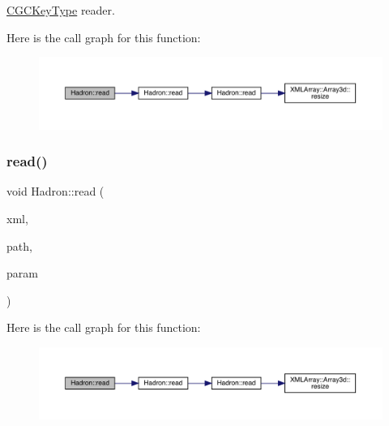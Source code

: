 \mbox{\hyperlink{structHadron_1_1CGCKeyType}{C\+G\+C\+Key\+Type}} reader. 

Here is the call graph for this function\+:
\nopagebreak
\begin{figure}[H]
\begin{center}
\leavevmode
\includegraphics[width=350pt]{d1/daf/namespaceHadron_ad89b4230ad913b777ca725473df40d15_cgraph}
\end{center}
\end{figure}
\mbox{\label{namespaceHadron_aef0c0dfd0f87842b485511132f1c405f}} 
\subsubsection{\texorpdfstring{read()}{read()}\hspace{0.1cm}{\footnotesize\ttfamily [14/94]}}
{\footnotesize\ttfamily void Hadron\+::read (\begin{DoxyParamCaption}\item[{\mbox{\hyperlink{classADATXML_1_1XMLReader}{X\+M\+L\+Reader}} \&}]{xml,  }\item[{const std\+::string \&}]{path,  }\item[{\mbox{\hyperlink{structHadron_1_1KeyHadronNPartNPtCorr__t_1_1NPoint__t}{Key\+Hadron\+N\+Part\+N\+Pt\+Corr\+\_\+t\+::\+N\+Point\+\_\+t}} \&}]{param }\end{DoxyParamCaption})}

Here is the call graph for this function\+:
\nopagebreak
\begin{figure}[H]
\begin{center}
\leavevmode
\includegraphics[width=350pt]{d1/daf/namespaceHadron_aef0c0dfd0f87842b485511132f1c405f_cgraph}
\end{center}
\end{figure}
\mbox{\label{namespaceHadron_aa4df93329eeddeec176cd9df5abe9ce1}} 
